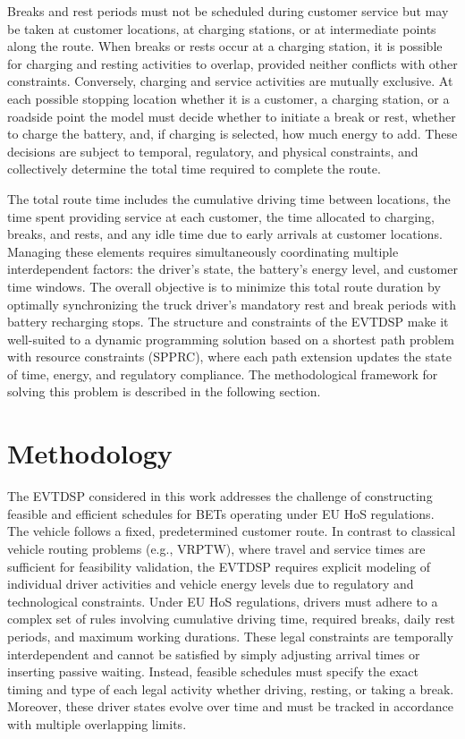 \documentclass[trsc,dblanonrev]{informs4}
\begin{document}
Breaks and rest periods must not be scheduled during customer service but may be taken at customer locations, at charging stations, or at intermediate points along the route. When breaks or rests occur at a charging station, it is possible for charging and resting activities to overlap, provided neither conflicts with other constraints. Conversely, charging and service activities are mutually exclusive. At each possible stopping location whether it is a customer, a charging station, or a roadside point the model must decide whether to initiate a break or rest, whether to charge the battery, and, if charging is selected, how much energy to add. These decisions are subject to temporal, regulatory, and physical constraints, and collectively determine the total time required to complete the route.

The total route time includes the cumulative driving time between locations, the time spent providing service at each customer, the time allocated to charging, breaks, and rests, and any idle time due to early arrivals at customer locations. Managing these elements requires simultaneously coordinating multiple interdependent factors: the driver's state, the battery's energy level, and customer time windows. The overall objective is to minimize this total route duration by optimally synchronizing the truck driver’s mandatory rest and break periods with battery recharging stops. The structure and constraints of the EVTDSP make it well-suited to a dynamic programming solution based on a shortest path problem with resource constraints (SPPRC), where each path extension updates the state of time, energy, and regulatory compliance. The methodological framework for solving this problem is described in the following section.


\section{Methodology}

The EVTDSP considered in this work addresses the challenge of constructing feasible and efficient schedules for BETs operating under EU HoS regulations. The vehicle follows a fixed, predetermined customer route. In contrast to classical vehicle routing problems (e.g., VRPTW), where travel and service times are sufficient for feasibility validation, the EVTDSP requires explicit modeling of individual driver activities and vehicle energy levels due to regulatory and technological constraints. Under EU HoS regulations, drivers must adhere to a complex set of rules involving cumulative driving time, required breaks, daily rest periods, and maximum working durations. These legal constraints are temporally interdependent and cannot be satisfied by simply adjusting arrival times or inserting passive waiting. Instead, feasible schedules must specify the exact timing and type of each legal activity whether driving, resting, or taking a break. Moreover, these driver states evolve over time and must be tracked in accordance with multiple overlapping limits.
\end{document}
